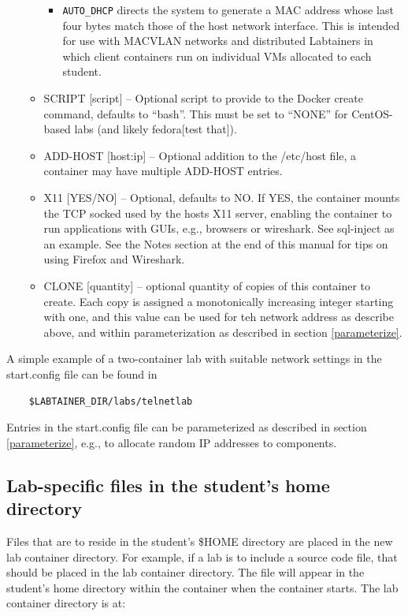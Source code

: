 \documentclass[12pt]{article}
\begin{document}
\begin{itemize}
\begin{itemize}
\begin{itemize}
\item {\tt AUTO\_DHCP} directs the system to generate a MAC address whose last four bytes match those of the host network interface.
This is intended for use with MACVLAN networks and distributed Labtainers in which client containers run on individual VMs allocated
to each student.
\end{itemize}
\item SCRIPT [script] -- Optional script to provide to the Docker create command, defaults to ``bash''.  This must be set to
``NONE'' for CentOS-based labs (and likely fedora[test that]).
\item ADD-HOST [host:ip] -- Optional addition to the /etc/host file, a container may have multiple ADD-HOST entries.
\item X11 [YES/NO] -- Optional, defaults to NO.  If YES, the container mounts the TCP socked used by the hosts X11 server,
enabling the container to run applications with GUIs, e.g., browsers or wireshark.  See sql-inject as an example.  See the
Notes section at the end of this manual for tips on using Firefox and Wireshark.
\item CLONE [quantity] -- optional quantity of copies of this container to create. Each copy is assigned a monotonically
increasing integer starting with one, and this value can be used for teh network address as describe above, and within
parameterization as described in section \ref{parameterize}.

\end{itemize}
\end{itemize}
  
A simple example of a two-container lab with suitable network settings in the start.config file can be found in 
\begin{verbatim}
    $LABTAINER_DIR/labs/telnetlab
\end{verbatim}
Entries in the start.config file can be parameterized as described in section \ref{parameterize}, e.g., to allocate
random IP addresses to components.


\subsection {Lab-specific files in the student's home directory}
\label{home files}
Files that are to reside in the student's \$HOME directory are placed in the 
new lab container directory.  For example, if a lab is to include a source code file, that
should be placed in the lab container directory. The file will appear in the student's
home directory within the container when the container starts.  The lab container
directory is at:  
\end{document}
